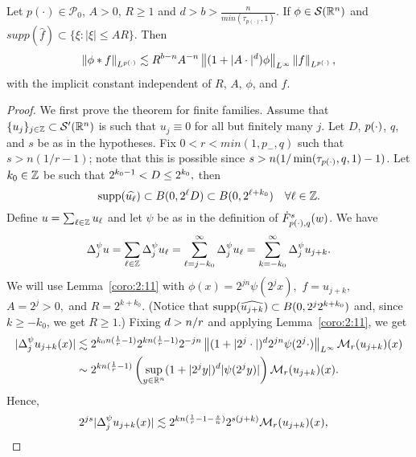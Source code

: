 \begin{lemma}\label{lemma:variableLebesgue}
Let $p(\cdot) \in \mathcal{P}_0$, $A>0$, $R\geq 1$ and $d>b>\frac{n}{min(\tau_{p(\cdot)},1)}$. If $\phi \in \sw$ and $supp(\widehat{f}) \subset \{\xi: |\xi| \leq AR \}$. Then 
\begin{equation}
\norm{\phi \ast f}{\Lp} \lesssim R^{b-n}A^{-n}\norm{(1+|A\cdot|^d)\phi}{L^\infty}\norm{f}{\Lp},
\end{equation}
with the implicit constant independent of $R$, $A$, $\phi$, and $f$.
\end{lemma}



\begin{proof}
We first prove the theorem for finite families. Assume that $\{u_j\}_{j \in \ent} \subset \mathcal{S}'(\rn)$ is such that $u_j \equiv 0$ for all but finitely many $j$. Let $D$, $\pp$, $q$, and $s$ be as in the hypotheses. Fix $0<r<min(1,p_-,q)$ such that $s>n(1/r-1)$; note that this is possible since $s>n(1/\min(\tau_{\pp},q,1)-1)$. Let $k_0 \in \ent$ be such that $2^{k_0 -1} < \A\leq 2^{k_0},$ then  
\[
\supp(\widehat{u_\ell}) \subset B(0, 2^\ell \A) \subset B(0, 2^{\ell +k_0}) \quad \forall \ell \in \ent.
\]
Define $u =\sum_{\ell \in \ent} u_\ell$ and let $\psi$ be as in the definition of $\tlw{\pp}{s}{q}{w}$. We have
\begin{equation}\label{psi*u}
\Delta^\psi_j u = \sum_{\ell \in \ent} \Delta^\psi_j u_\ell = \sum_{\ell = j - k_0}^\infty \Delta^\psi_j  u_\ell = \sum_{k = - k_0}^\infty \Delta^\psi_j u_{j+k}.
\end{equation}
We will use Lemma~\ref{coro:2:11} with $\phi(x) =  2^{jn} \psi(2^j x),$  $f = u_{j+k},$  $A= 2^{j}>0,$ and $R= 2^{k + k_0}.$ (Notice that $\supp(\widehat{u_{j+k}}) \subset  B(0, 2^{j} 2^{k + k_0})$ and, since $k \geq -k_0$, we get $R \geq 1$.) Fixing  $\ex>n/r$ and applying Lemma~\ref{coro:2:11}, we get
\begin{align*}
|\Delta^\psi_j  u_{j+k}(x)| & \lesssim   2^{k_0n(\frac{1}{r} -1)} 2^{k n (\frac{1}{r} -1)}  2^{-jn} \norm{(1 + |2^j \cdot|)^\ex 2^{jn}\psi (2^j\cdot)}{L^\infty}  \M_r(u_{j+k})(x)\\
& \sim  2^{k n (\frac{1}{r} -1)} \left( \sup_{y \in \rn} (1 + |2^j y|)^\ex |\psi(2^j y)|\right) \M_r(u_{j+k})(x).
\end{align*}
 Hence,
\begin{align*}
2^{js}|\Delta^\psi_j  u_{j+k}(x)| & \lesssim 2^{k n (\frac{1}{r} -1-\frac{s}{n})} 2^{s(j+k)}\M_r(u_{j+k})(x),
\end{align*}

\end{proof}
